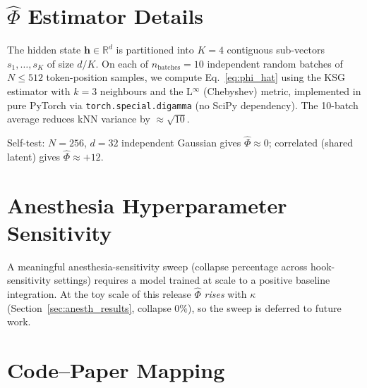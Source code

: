 \documentclass[11pt]{article}
\theoremstyle{definition}
\newcommand{\RR}{\mathbb{R}}
\newcommand{\vh}{\mathbf{h}}
\newcommand{\phihat}{\hat{\Phi}}
\begin{document}
\section{$\phihat$ Estimator Details}
\label{app:phi}

The hidden state $\vh\in\RR^d$ is partitioned into $K=4$ contiguous sub-vectors $s_1,\ldots,s_K$ of size $d/K$. On each of $n_\text{batches}=10$ independent random batches of $N\le 512$ token-position samples, we compute Eq.~\eqref{eq:phi_hat} using the KSG estimator with $k=3$ neighbours and the L$^\infty$ (Chebyshev) metric, implemented in pure PyTorch via \texttt{torch.special.digamma} (no SciPy dependency). The 10-batch average reduces kNN variance by $\approx\sqrt{10}$.

Self-test: $N=256$, $d=32$ independent Gaussian gives $\phihat\approx 0$; correlated (shared latent) gives $\phihat\approx +12$.

\section{Anesthesia Hyperparameter Sensitivity}
\label{app:sensitivity}

A meaningful anesthesia-sensitivity sweep (collapse percentage across hook-sensitivity settings) requires a model trained at scale to a positive baseline integration. At the toy scale of this release $\hat{\Phi}$ \emph{rises} with $\kappa$ (Section~\ref{sec:anesth_results}, collapse $0\%$), so the sweep is deferred to future work.

\section{Code--Paper Mapping}
\label{app:map}
\end{document}
